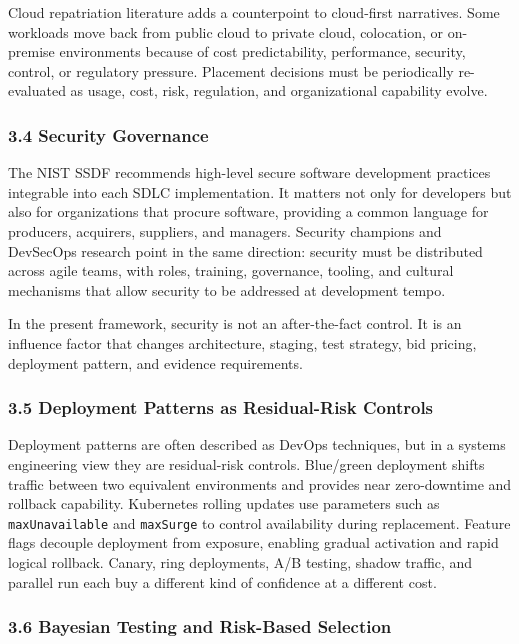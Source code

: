\documentclass[
]{article}
\begin{document}
Cloud repatriation literature adds a counterpoint to cloud-first
narratives. Some workloads move back from public cloud to private cloud,
colocation, or on-premise environments because of cost predictability,
performance, security, control, or regulatory pressure. Placement
decisions must be periodically re-evaluated as usage, cost, risk,
regulation, and organizational capability evolve.

\subsubsection{3.4 Security Governance}\label{security-governance}

The NIST SSDF recommends high-level secure software development
practices integrable into each SDLC implementation. It matters not only
for developers but also for organizations that procure software,
providing a common language for producers, acquirers, suppliers, and
managers. Security champions and DevSecOps research point in the same
direction: security must be distributed across agile teams, with roles,
training, governance, tooling, and cultural mechanisms that allow
security to be addressed at development tempo.

In the present framework, security is not an after-the-fact control. It
is an influence factor that changes architecture, staging, test
strategy, bid pricing, deployment pattern, and evidence requirements.

\subsubsection{3.5 Deployment Patterns as Residual-Risk
Controls}\label{deployment-patterns-as-residual-risk-controls}

Deployment patterns are often described as DevOps techniques, but in a
systems engineering view they are residual-risk controls. Blue/green
deployment shifts traffic between two equivalent environments and
provides near zero-downtime and rollback capability. Kubernetes rolling
updates use parameters such as \texttt{maxUnavailable} and
\texttt{maxSurge} to control availability during replacement. Feature
flags decouple deployment from exposure, enabling gradual activation and
rapid logical rollback. Canary, ring deployments, A/B testing, shadow
traffic, and parallel run each buy a different kind of confidence at a
different cost.

\subsubsection{3.6 Bayesian Testing and Risk-Based
Selection}\label{bayesian-testing-and-risk-based-selection}
\end{document}
